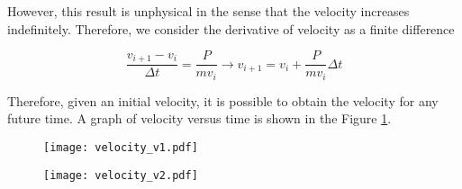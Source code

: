 \documentclass{article}
\begin{document}
However, this result is unphysical in the sense that the velocity increases indefinitely. Therefore, we consider the derivative of velocity as a finite difference


$$ \frac{v_{i+1} - v_i}{\Delta t} = \frac{P}{mv_{i}} \rightarrow v_{i+1} = v_i + \frac{P}{mv_{i}}\Delta t$$

Therefore, given an initial velocity, it is possible to obtain the velocity for any future time. A graph of velocity versus time is shown in the Figure \ref{f1}.

\begin{figure}[!h]
  \centering
  \texttt{[image: velocity\_v1.pdf]}
  \caption{}
  \label{f1}
\end{figure}

\begin{figure}[!h]
  \centering
  \texttt{[image: velocity\_v2.pdf]}
\end{figure}
\end{document}

